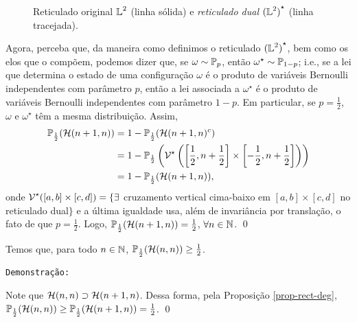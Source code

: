 \begin{figure*}[!htbp]
	\centering
	
	\vspace{-12pt}
	\caption{Reticulado original $\operatorname{\mathbb{L}}^2$ (linha sólida) e \textit{reticulado dual} ${(\operatorname{\mathbb{L}}^2)}^{\star}$ (linha tracejada).}
	\label{fig-rede-dual}
\end{figure*}

\par Agora, perceba que, da maneira como definimos o reticulado ${(\operatorname{\mathbb{L}}^2)}^{\star}$, bem como os elos que o compõem, podemos dizer que, se $\omega \sim \operatorname{\mathbb{P}}_p$, então $\omega^{\star} \sim \operatorname{\mathbb{P}}_{1-p}$; i.e., se a lei que determina o estado de uma configuração $\omega$ é o produto de variáveis Bernoulli independentes com parâmetro $p$, então a lei associada a $\omega^{\star}$ é o produto de variáveis Bernoulli independentes com parâmetro $1 - p$. Em particular, se $p = \frac{1}{2}$, $\omega$ e $\omega^{\star}$ têm a mesma distribuição. Assim,
\begin{align*}
	\operatorname{\mathbb{P}}_{\frac{1}{2}}(\operatorname{\mathcal{H}}(n+1, n)) &= 1 - \operatorname{\mathbb{P}}_{\frac{1}{2}}(\operatorname{\mathcal{H}}(n+1, n)^c) \\
								   &= 1 - \operatorname{\mathbb{P}}_{\frac{1}{2}}\left(\operatorname{\mathcal{V}}^{\star}\left(\left[\frac{1}{2}, n+\frac{1}{2}\right]\times\left[-\frac{1}{2}, n+\frac{1}{2}\right]\right)\right)\\
								   &= 1 - \operatorname{\mathbb{P}}_{\frac{1}{2}}(\operatorname{\mathcal{H}}(n+1, n)),
\end{align*}
onde $\operatorname{\mathcal{V}}^{\star}([a, b] \times [c, d]) = \{\exists$ cruzamento vertical cima-baixo em $[a, b] \times [c, d]$ no reticulado dual$\}$ e a última igualdade usa, além de invariância por translação, o fato de que $p = \frac{1}{2}$. Logo, $\operatorname{\mathbb{P}}_{\frac{1}{2}}(\operatorname{\mathcal{H}}(n+1, n)) = \frac{1}{2}$, $\forall n \in \operatorname{\mathbb{N}}$. \hspace{\fill}\qed

\begin{mycol} \label{col-crossing}
	Temos que, para todo $n \in \operatorname{\mathbb{N}}$, $\operatorname{\mathbb{P}}_{\frac{1}{2}}(\operatorname{\mathcal{H}}(n, n)) \geq \frac{1}{2}$.
\end{mycol}
	
\par \texttt{Demonstração:}

\par Note que $\operatorname{\mathcal{H}}(n, n) \supset \operatorname{\mathcal{H}}(n+1, n)$. Dessa forma, pela Proposição \ref{prop-rect-deg}, $\operatorname{\mathbb{P}}_{\frac{1}{2}}(\operatorname{\mathcal{H}}(n, n)) \geq \operatorname{\mathbb{P}}_{\frac{1}{2}}(\operatorname{\mathcal{H}}(n+1, n)) = \frac{1}{2}$. \hspace{\fill}\qed

